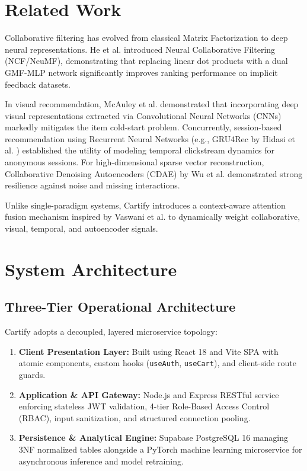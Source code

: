 \documentclass[conference]{IEEEtran}
\begin{document}
\section{Related Work}
Collaborative filtering has evolved from classical Matrix Factorization \cite{koren2009matrix} to deep neural representations. He et al. \cite{he2017ncf} introduced Neural Collaborative Filtering (NCF/NeuMF), demonstrating that replacing linear dot products with a dual GMF-MLP network significantly improves ranking performance on implicit feedback datasets.

In visual recommendation, McAuley et al. \cite{mcauley2015visual} demonstrated that incorporating deep visual representations extracted via Convolutional Neural Networks (CNNs) markedly mitigates the item cold-start problem. Concurrently, session-based recommendation using Recurrent Neural Networks (e.g., GRU4Rec by Hidasi et al. \cite{hidasi2016gru}) established the utility of modeling temporal clickstream dynamics for anonymous sessions. For high-dimensional sparse vector reconstruction, Collaborative Denoising Autoencoders (CDAE) by Wu et al. \cite{wu2016cdae} demonstrated strong resilience against noise and missing interactions.

Unlike single-paradigm systems, Cartify introduces a context-aware attention fusion mechanism inspired by Vaswani et al. \cite{vaswani2017attention} to dynamically weight collaborative, visual, temporal, and autoencoder signals.

\section{System Architecture}
\subsection{Three-Tier Operational Architecture}
Cartify adopts a decoupled, layered microservice topology:
\begin{enumerate}
    \item \textbf{Client Presentation Layer:} Built using React 18 and Vite SPA with atomic components, custom hooks (\texttt{useAuth}, \texttt{useCart}), and client-side route guards.
    \item \textbf{Application \& API Gateway:} Node.js and Express RESTful service enforcing stateless JWT validation, 4-tier Role-Based Access Control (RBAC), input sanitization, and structured connection pooling.
    \item \textbf{Persistence \& Analytical Engine:} Supabase PostgreSQL 16 managing 3NF normalized tables alongside a PyTorch machine learning microservice for asynchronous inference and model retraining.
\end{enumerate}
\end{document}
